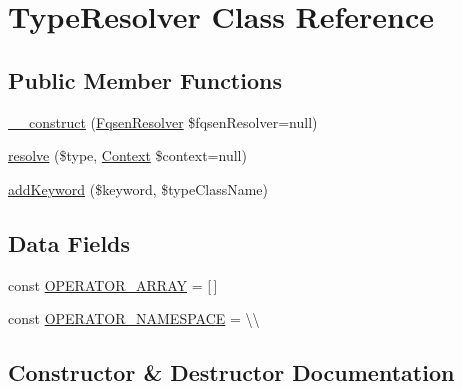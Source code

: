 \hypertarget{classphp_documentor_1_1_reflection_1_1_type_resolver}{}\section{Type\+Resolver Class Reference}
\label{classphp_documentor_1_1_reflection_1_1_type_resolver}
\subsection*{Public Member Functions}
\begin{DoxyCompactItemize}
\item 
\mbox{\hyperlink{classphp_documentor_1_1_reflection_1_1_type_resolver_a420a7c80868c9841d5f8a19f106e93c0}{\+\_\+\+\_\+construct}} (\mbox{\hyperlink{classphp_documentor_1_1_reflection_1_1_fqsen_resolver}{Fqsen\+Resolver}} \$fqsen\+Resolver=null)
\item 
\mbox{\hyperlink{classphp_documentor_1_1_reflection_1_1_type_resolver_afd270cc5db7dbb5eecce1c57c443ae2a}{resolve}} (\$type, \mbox{\hyperlink{classphp_documentor_1_1_reflection_1_1_types_1_1_context}{Context}} \$context=null)
\item 
\mbox{\hyperlink{classphp_documentor_1_1_reflection_1_1_type_resolver_ae6b1b230b7cdd893066228b4bff05fcd}{add\+Keyword}} (\$keyword, \$type\+Class\+Name)
\end{DoxyCompactItemize}
\subsection*{Data Fields}
\begin{DoxyCompactItemize}
\item 
const \mbox{\hyperlink{classphp_documentor_1_1_reflection_1_1_type_resolver_a6bfaf0b767894e66918fcea7675796e1}{O\+P\+E\+R\+A\+T\+O\+R\+\_\+\+A\+R\+R\+AY}} = \textquotesingle{}\mbox{[}$\,$\mbox{]}\textquotesingle{}
\item 
const \mbox{\hyperlink{classphp_documentor_1_1_reflection_1_1_type_resolver_a19edcdc9d5b7dc49985e779614b90973}{O\+P\+E\+R\+A\+T\+O\+R\+\_\+\+N\+A\+M\+E\+S\+P\+A\+CE}} = \textquotesingle{}\textbackslash{}\textbackslash{}\textquotesingle{}
\end{DoxyCompactItemize}


\subsection{Constructor \& Destructor Documentation}
\mbox{\label{classphp_documentor_1_1_reflection_1_1_type_resolver_a420a7c80868c9841d5f8a19f106e93c0}} 
